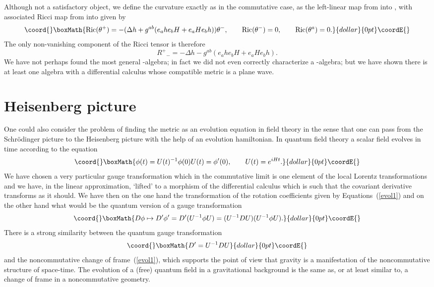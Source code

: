 \documentclass[12pt,a4paper]{article}
\newcounter{eg}
\def\t#1{\tilde #1}
\def\c#1{{\cal #1}}
\providecommand{\initiate}{\setcounter{equation}{0}}
\begin{document}
Although not a satisfactory object, we define the curvature exactly
as in the commutative case, as the left-linear map 
\coordHE{} from \myHighlight{$\Omega^1(\c{A})$}\coordHE{} into 
\myHighlight{$\Omega^2(\c{A}) \otimes \Omega^1(\c{A})$}\coordHE{}, with associated Ricci map
from \myHighlight{$\Omega^1(\c{A})$}\coordHE{} into \myHighlight{$\Omega^1(\c{A})$}\coordHE{} given by
$$\coord{}\boxMath{
\mbox{Ric} (\theta^+) = -(\Delta h + g^{ab} (e_a h e_b H + e_a H e_b h)) 
\theta^-, \qquad 
\mbox{Ric} (\theta^-) = 0, \qquad
\mbox{Ric} (\theta^a) = 0.
}{dollar}{0pt}\coordE{}$$
The only
non-vanishing component of the Ricci tensor is therefore
$$
R^+{}_- = -\Delta h - g^{ab} (e_a h e_b H + e_a H e_b h).    %
$$ We have not perhaps found the most general \coordHE{}-algebra; in fact we
did not even correctly characterize a \coordHE{}-algebra; but we have shown
there is at least one algebra with a differential calculus whose
compatible metric is a plane wave.


\initiate
\section{Heisenberg  picture}                            \label{Heis}

One could also consider the problem of finding the metric as an evolution
equation in field theory in the sense that one can pass from the
Schr\"odinger picture to the Heisenberg picture with the help of an
evolution hamiltonian. In quantum field theory a scalar field evolves
in time according to the equation
$$\coord{}\boxMath{
\phi(t) = U(t)^{-1}\phi(0)U(t) = \phi^\prime (0), \qquad U(t) = e^{iHt}.
}{dollar}{0pt}\coordE{}$$
We have chosen a very particular gauge transformation \myHighlight{$\t{\Lambda}$}\coordHE{} which
in the commutative limit is one element of the local Lorentz
transformations and we have, in the linear approximation, `lifted'
\myHighlight{$\t{\Lambda}$}\coordHE{} to a morphism \myHighlight{$\Lambda$}\coordHE{} of the differential calculus
which is such that the covariant derivative transforms as it
should. We have then on the one hand the transformation of the
rotation coefficients given by Equations~(\ref{evol1}) and on the
other hand what would be the quantum version of a gauge transformation
$$\coord{}\boxMath{
D\phi \mapsto D^\prime \phi^\prime = 
D^\prime (U^{-1}\phi U) = (U^{-1}D U) (U^{-1}\phi U).
}{dollar}{0pt}\coordE{}$$
There is a strong similarity between the quantum gauge transformation 
$$\coord{}\boxMath{
D^\prime = U^{-1}D U
}{dollar}{0pt}\coordE{}$$
and the noncommutative change of frame~(\ref{evol1}), which supports
the point of view that gravity is a manifestation of the
noncommutative structure of space-time. The evolution of a (free)
quantum field in a gravitational background is the same as, or at
least similar to, a change of frame in a noncommutative geometry.
\end{document}
